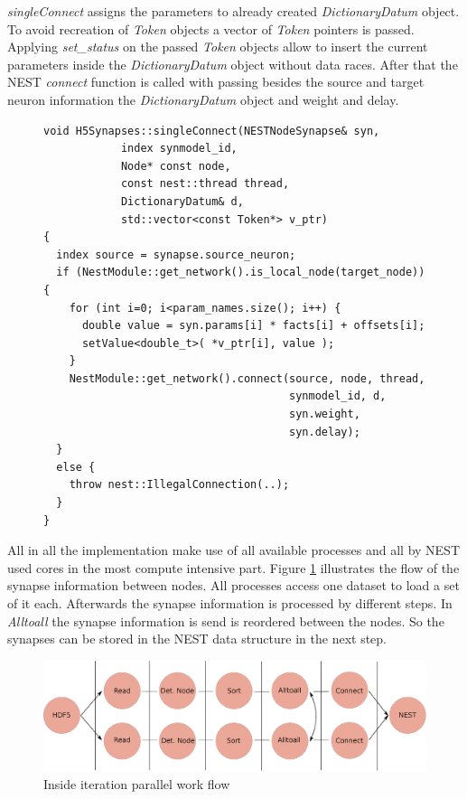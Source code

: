 \emph{singleConnect} assigns the parameters to already created \emph{DictionaryDatum} object.
To avoid recreation of \emph{Token} objects a vector of  \emph{Token} pointers is
passed. Applying \emph{set\_{}status} on the passed \emph{Token} objects allow to
insert the current parameters inside the \emph{DictionaryDatum} object without data races.
After that the NEST \emph{connect} function is called with passing besides the source and target
neuron information the \emph{DictionaryDatum} object and weight and delay.
\begin{figure}[ht!]
\begin{lstlisting}[style=cppcode]
void H5Synapses::singleConnect(NESTNodeSynapse& syn, 
    		index synmodel_id,
    		Node* const node,
    		const nest::thread thread,
    		DictionaryDatum& d, 
    		std::vector<const Token*> v_ptr)
{
  index source = synapse.source_neuron;
  if (NestModule::get_network().is_local_node(target_node)) { 
    for (int i=0; i<param_names.size(); i++) {
      double value = syn.params[i] * facts[i] + offsets[i];
      setValue<double_t>( *v_ptr[i], value );
    }
    NestModule::get_network().connect(source, node, thread,
                                      synmodel_id, d,
                                      syn.weight,
                                      syn.delay);
  }
  else {
    throw nest::IllegalConnection(..);
  }
}
\end{lstlisting}
\caption{}
\end{figure}

\newpage
All in all the implementation make use of all available processes and all by NEST used cores in the most compute intensive part.
Figure \ref{fig:ConnectInsideIteration} illustrates the flow of the synapse information between nodes. 
All processes access one dataset to load a set of it each. Afterwards the synapse information is processed by different steps.
In \emph{Alltoall} the synapse information is send is reordered between the nodes.
So the synapses can be stored in the NEST data structure in the next step.
\begin{figure}[ht!]
\centering
\includegraphics[scale=0.4]{pictures/Connect_inside_iteration.eps}
\caption{Inside iteration parallel work flow}
\label{fig:ConnectInsideIteration}
\end{figure}

